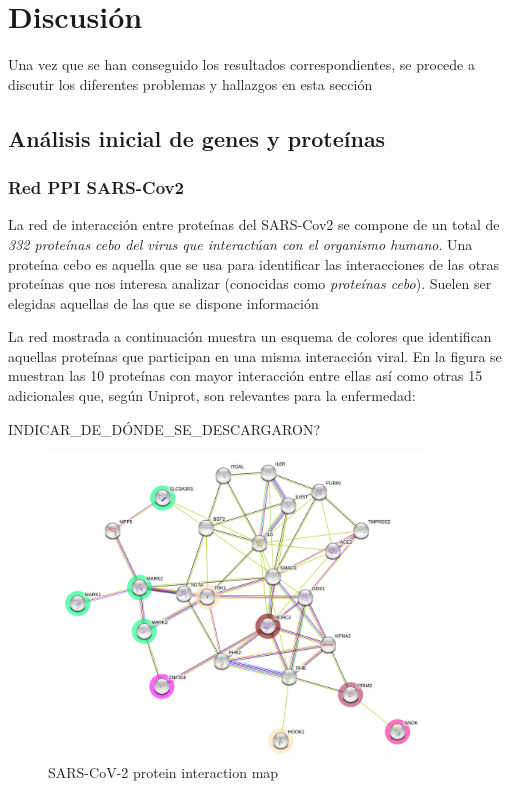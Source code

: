 \section{Discusión}

Una vez que se han conseguido los resultados correspondientes, se procede a discutir los diferentes problemas y hallazgos en esta sección

\subsection{Análisis inicial de genes y proteínas}

\subsubsection{Red PPI SARS-Cov2}

La red de interacción entre proteínas del SARS-Cov2 se compone de un total de \emph{332 proteínas cebo del virus que interactúan con el organismo humano}. Una proteína cebo es aquella que se usa para identificar las interacciones de las otras proteínas que nos interesa analizar (conocidas como \textit{proteínas cebo}). Suelen ser elegidas aquellas de las que se dispone información 

\newline

La red mostrada a continuación muestra un esquema de colores que identifican aquellas proteínas que participan en una misma interacción viral. En la figura se muestran las 10 proteínas con mayor interacción entre ellas así como otras 15 adicionales que, según Uniprot, son relevantes para la enfermedad:

INDICAR_DE_DÓNDE_SE_DESCARGARON?

	\begin{figure}[h!]
		\includegraphics[width=0.9\textwidth]{figures/PPInetSARSCov2BaitProt.png}
		\caption{SARS-CoV-2 protein interaction map}
		\label{fig:ppi_net}
	\end{figure}
	

